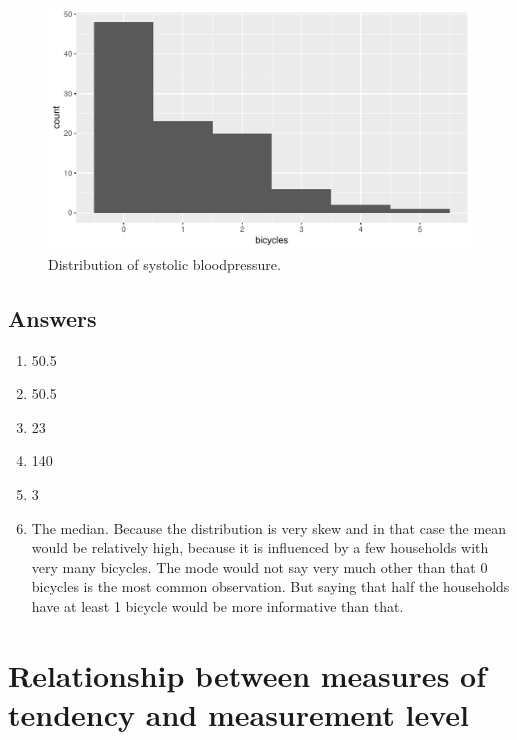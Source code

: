 \documentclass[]{book}\usepackage[]{graphicx}\usepackage[]{color}
\makeatletter
\def\maxwidth{ %
  \ifdim\Gin@nat@width>\linewidth
    \linewidth
  \else
    \Gin@nat@width
  \fi
}
\makeatother
\begin{document}
\begin{enumerate}
\begin{figure}

{\centering \includegraphics[width=\maxwidth]{figure/mode2-1} 

}

\caption[Distribution of systolic bloodpressure]{Distribution of systolic bloodpressure.}\label{fig:mode2}
\end{figure}





\end{enumerate}


\subsection{Answers}

\begin{enumerate}
\item 50.5
\item 50.5
\item  23
\item 140
\item 3
\item The median. Because the distribution is very skew and in that case the mean would be relatively high, because it is influenced by a few households with very many bicycles. The mode would not say very much other than that 0 bicycles is the most common observation. But saying that half the households have at least 1 bicycle would be more informative than that. 

\end{enumerate}


\section{Relationship between measures of tendency and measurement level}
\end{document}
